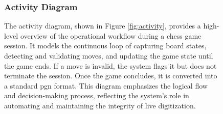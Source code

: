 \begin{figure}[h!]
    \subsubsection*{Activity Diagram}
    \label{subsubsec:activity-diagram}
    
    \centering
    \begin{minipage}[t]{0.5\textwidth}
        \vspace{0pt}
        The activity diagram, shown in Figure \ref{fig:activity}, provides a high-level overview of the operational workflow during a chess game session. It models the continuous loop of capturing board states, detecting and validating moves, and updating the game state until the game ends. If a move is invalid, the system flags it but does not terminate the session. Once the game concludes, it is converted into a standard \gls{pgn} format. This diagram emphasizes the logical flow and decision-making process, reflecting the system’s role in automating and maintaining the integrity of live digitization.
    \end{minipage}
    \hfill
    \begin{minipage}[t]{0.45\textwidth}
        \vspace{0pt}

\end{minipage}
\end{figure}
